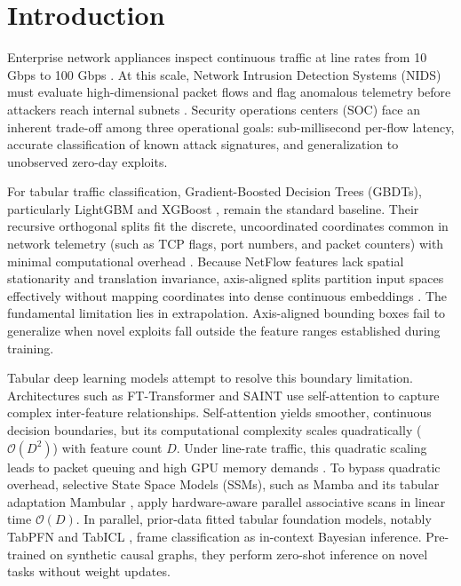 \documentclass[10pt,a4paper]{article}
\begin{document}
\vspace{1em}

\section{Introduction}
Enterprise network appliances inspect continuous traffic at line rates from 10 Gbps to 100 Gbps \cite{ring2019survey, ahmad2021network}. At this scale, Network Intrusion Detection Systems (NIDS) must evaluate high-dimensional packet flows and flag anomalous telemetry before attackers reach internal subnets \cite{apruzzese2023role}. Security operations centers (SOC) face an inherent trade-off among three operational goals: sub-millisecond per-flow latency, accurate classification of known attack signatures, and generalization to unobserved zero-day exploits.

For tabular traffic classification, Gradient-Boosted Decision Trees (GBDTs), particularly LightGBM \cite{ke2017lightgbm} and XGBoost \cite{chen2016xgboost}, remain the standard baseline. Their recursive orthogonal splits fit the discrete, uncoordinated coordinates common in network telemetry (such as TCP flags, port numbers, and packet counters) with minimal computational overhead \cite{grinsztajn2022why}. Because NetFlow features lack spatial stationarity and translation invariance, axis-aligned splits partition input spaces effectively without mapping coordinates into dense continuous embeddings \cite{mcelfresh2023when}. The fundamental limitation lies in extrapolation. Axis-aligned bounding boxes fail to generalize when novel exploits fall outside the feature ranges established during training.

Tabular deep learning models attempt to resolve this boundary limitation. Architectures such as FT-Transformer \cite{gorishniy2021revisiting} and SAINT \cite{somepalli2021saint} use self-attention to capture complex inter-feature relationships. Self-attention yields smoother, continuous decision boundaries, but its computational complexity scales quadratically ($\mathcal{O}(D^2)$) with feature count $D$. Under line-rate traffic, this quadratic scaling leads to packet queuing and high GPU memory demands \cite{borisov2022deep}. To bypass quadratic overhead, selective State Space Models (SSMs), such as Mamba \cite{gu2023mamba} and its tabular adaptation Mambular \cite{thielmann2024mambular}, apply hardware-aware parallel associative scans in linear time $\mathcal{O}(D)$. In parallel, prior-data fitted tabular foundation models, notably TabPFN \cite{hollmann2025accurate} and TabICL \cite{qu2025tabicl}, frame classification as in-context Bayesian inference. Pre-trained on synthetic causal graphs, they perform zero-shot inference on novel tasks without weight updates.
\end{document}
